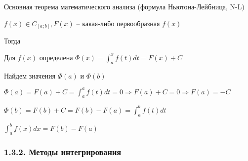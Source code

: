 \documentclass[12pt]{article}
\begin{document}
    \begin{MyTheorem}
        \Ths \hypertarget{formulanewtonleibniz}{Основная теорема математического анализа} (формула Ньютона-Лейбница, N-L)

        $f(x) \in C_{[a;b]}, F(x)$ -- какая-либо первообразная $f(x)$

        Тогда 
    \end{MyTheorem}

    \begin{MyProof}
        Для $f(x)$ определена $\Phi(x) = \int_a^x f(t)dt = F(x) + C$

        Найдем значения $\Phi(a)$ и $\Phi(b)$

        $\Phi(a) = F(a) + C = \int^a_a f(t)dt = 0 \Longrightarrow F(a) + C = 0 \Longrightarrow F(a) = -C$

        $\Phi(b) = F(b) + C = F(b) - F(a) = \int^b_a f(t) dt$

        $\int^b_a f(x)dx = F(b) - F(a)$
    \end{MyProof}


    \subsubsection{1.3.2. Методы интегрирования}
\end{document}
